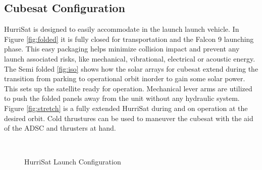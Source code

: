 \subsection{Cubesat Configuration}
HurriSat is designed to easily accommodate in the launch launch vehicle. In Figure \ref{fig:folded} it is fully closed  for transportation and the Falcon 9 launching phase.  This easy packaging  helps minimize collision impact and prevent any launch associated risks, like mechanical, vibrational, electrical or acoustic energy.  The Semi folded \ref{fig:iso} shows how the solar arrays for cubesat extend during the transition from parking to operational orbit inorder to gain some solar power. This sets up the satellite ready for operation. Mechanical lever arms are utilized to push the folded panels away from the unit without any hydraulic system. Figure \ref{fig:stretch} is a fully extended HurriSat during and on operation at the desired orbit. Cold thrustures can be used to maneuver the cubesat with the aid of the ADSC and thrusters at hand.
\begin{figure}
    \centering
    \\[.2in]
    \qquad
    \caption{HurriSat Launch Configuration}
    \label{fig:config}
\end{figure}